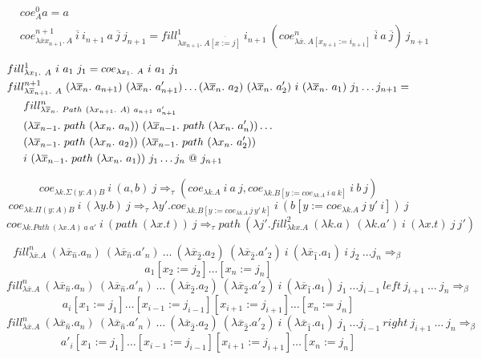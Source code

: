 \documentclass{amsart}
\theoremstyle{definition}
\theoremstyle{remark}
\newcommand{\red}{\Rightarrow}
\numberwithin{figure}{section}
\begin{document}
\begin{align*}
& coe^0_A a = a \\
& coe^{n+1}_{\lambda \overline{x} x_{n+1}.\ A}\ \overline{i}\ i_{n+1}\ a\ \overline{j}\ j_{n+1} = fill^1_{\lambda x_{n+1}.\ A \overline{[x := j]}}\ i_{n+1}\ (coe^n_{\lambda \overline{x}.\ A[x_{n+1} := i_{n+1}]}\ \overline{i}\ a\ \overline{j})\ j_{n+1}
\end{align*}

\begin{align*}
& fill^1_{\lambda x_1.\ A}\ i\ a_1\ j_1 = coe_{\lambda x_1.\ A}\ i\ a_1\ j_1 \\
& fill^{n+1}_{\lambda \overline{x}_{n+1}.\ A}\ (\lambda \overline{x}_n.\ a_{n+1})\ (\lambda \overline{x}_n.\ a'_{n+1}) \ldots (\lambda \overline{x}_n.\ a_2)\ (\lambda \overline{x}_n.\ a'_2)\ i\ (\lambda \overline{x}_n.\ a_1)\ j_1 \ldots j_{n+1} = \\
& \indent fill^n_{\lambda \overline{x}_n.\ Path\ (\lambda x_{n+1}.\ A)\ a_{n+1}\ a'_{n+1}} \\
& \indent (\lambda \overline{x}_{n-1}.\ path\ (\lambda x_n.\ a_n))\ (\lambda \overline{x}_{n-1}.\ path\ (\lambda x_n.\ a'_n)) \ldots \\
& \indent (\lambda \overline{x}_{n-1}.\ path\ (\lambda x_n.\ a_2))\ (\lambda \overline{x}_{n-1}.\ path\ (\lambda x_n.\ a'_2)) \\
& \indent i\ (\lambda \overline{x}_{n-1}.\ path\ (\lambda x_n.\ a_1))\ j_1 \ldots j_n\ @\ j_{n+1}
\end{align*}

\[ coe_{\lambda k. \Sigma (y : A) B}\ i\ (a, b)\ j \red_\tau (coe_{\lambda k. A}\ i\ a\ j, coe_{\lambda k. B[y := coe_{\lambda k. A}\ i\ a\ k]}\ i\ b\ j) \]
\[ coe_{\lambda k. \Pi (y : A) B}\ i\ (\lambda y. b)\ j \red_\tau \lambda y'. coe_{\lambda k. B[y := coe_{\lambda k. A}\,j\,y'\,k]}\ i\ (b[y := coe_{\lambda k. A}\ j\ y'\ i])\ j \]
\[ coe_{\lambda k. Path\ (\lambda x. A)\ a\ a'}\ i\ (path\ (\lambda x. t))\ j \red_\tau path\ (\lambda j'. fill^2_{\lambda k x. A}\ (\lambda k. a)\ (\lambda k. a')\ i\ (\lambda x. t)\ j\ j') \]

\[ fill^n_{\lambda \overline{x}. A}\ (\lambda \overline{x}_{\hat{n}}. a_n)\ (\lambda \overline{x}_{\hat{n}}. a'_n)\ \ldots\ (\lambda \overline{x}_{\hat{2}}. a_2)\ (\lambda \overline{x}_{\hat{2}}. a'_2)\ i\ (\lambda \overline{x}_{\hat{1}}. a_1)\ i\ j_2\ \ldots j_n \red_\beta \]
\[ a_1[x_2 := j_2] \ldots [x_n := j_n] \]
\[ fill^n_{\lambda \overline{x}. A}\ (\lambda \overline{x}_{\hat{n}}. a_n)\ (\lambda \overline{x}_{\hat{n}}. a'_n)\ \ldots\ (\lambda \overline{x}_{\hat{2}}. a_2)\ (\lambda \overline{x}_{\hat{2}}. a'_2)\ i\ (\lambda \overline{x}_{\hat{1}}. a_1)\ j_1\ \ldots j_{i-1}\ left\ j_{i+1}\ \ldots\ j_n \red_\beta \]
\[ a_i[x_1 := j_1] \ldots [x_{i-1} := j_{i-1}] [x_{i+1} := j_{i+1}] \ldots [x_n := j_n] \]
\[ fill^n_{\lambda \overline{x}. A}\ (\lambda \overline{x}_{\hat{n}}. a_n)\ (\lambda \overline{x}_{\hat{n}}. a'_n)\ \ldots\ (\lambda \overline{x}_{\hat{2}}. a_2)\ (\lambda \overline{x}_{\hat{2}}. a'_2)\ i\ (\lambda \overline{x}_{\hat{1}}. a_1)\ j_1\ \ldots j_{i-1}\ right\ j_{i+1}\ \ldots\ j_n \red_\beta \]
\[ a'_i[x_1 := j_1] \ldots [x_{i-1} := j_{i-1}] [x_{i+1} := j_{i+1}] \ldots [x_n := j_n] \]
\end{document}
